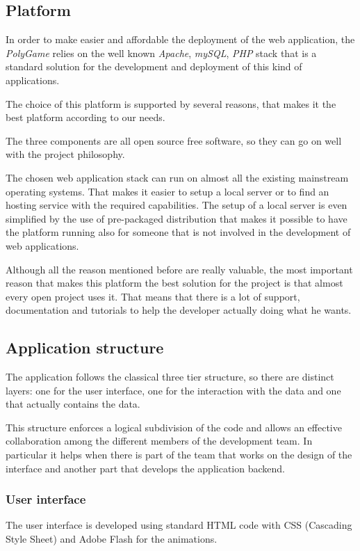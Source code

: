 \subsection{Platform}
In order to make easier and affordable the deployment of the web application, the \emph{PolyGame} relies on the well known \emph{Apache}, \emph{mySQL}, \emph{PHP} stack that is a standard solution for the development and deployment of this kind of applications.

The choice of this platform is supported by several reasons, that makes it the best platform according to our needs.

The three components are all open source free software, so they can go on well with the project philosophy.

The chosen web application stack can run on almost all the existing mainstream operating systems. That makes it easier to setup a local server or to find an hosting service with the required capabilities. The setup of a local server is even simplified by the use of pre-packaged distribution that makes it possible to have the platform running also for someone that is not involved in the development of web applications.

Although all the reason mentioned before are really valuable, the most important reason that makes this platform the best solution for the project is that almost every open project uses it. That means that there is a lot of support, documentation and tutorials to help the developer actually doing what he wants.

\subsection{Application structure}
The application follows the classical three tier structure, so there are distinct layers: one for the user interface, one for the interaction with the data and one that actually contains the data.

This structure enforces a logical subdivision of the code and allows an effective collaboration among the different members of the development team. In particular it helps when there is part of the team that works on the design of the interface and another part that develops the application backend.
\subsubsection{User interface}
The user interface is developed using standard HTML code with CSS (Cascading Style Sheet) and Adobe Flash for the animations.

